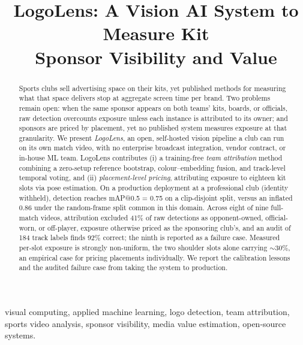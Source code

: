 \documentclass[conference,a4paper]{IEEEtran}
\begin{document}
\title{LogoLens: A Vision AI System to Measure Kit\\
Sponsor Visibility and Value}

\author{
}

\maketitle

\begin{abstract}
Sports clubs sell advertising space on their kits, yet published methods for measuring
what that space delivers stop at aggregate screen time per brand. Two problems remain
open: when the same sponsor appears on both teams' kits, boards, or officials, raw
detection overcounts exposure unless each instance is attributed to its owner; and
sponsors are priced by placement, yet no published system measures exposure at that
granularity. We present \emph{LogoLens}, an open, self-hosted vision pipeline a club
can run on its own match video, with no enterprise broadcast integration, vendor
contract, or in-house ML team. LogoLens contributes (i) a training-free \emph{team attribution}
method combining a zero-setup reference bootstrap, colour--embedding fusion, and
track-level temporal voting, and (ii) \emph{placement-level pricing}, attributing
exposure to eighteen kit slots via pose estimation. On a production deployment at a
professional club (identity withheld), detection reaches mAP@0.5 = 0.75 on a
clip-disjoint split, versus an inflated 0.86 under the random-frame split common in
this domain. Across eight of nine full-match videos, attribution excluded 41\% of raw
detections as opponent-owned, official-worn, or off-player, exposure otherwise priced
as the sponsoring club's, and an audit of 184 track labels finds 92\% correct; the
ninth is reported as a failure case. Measured per-slot exposure is strongly
non-uniform, the two shoulder slots alone carrying $\sim$30\%, an empirical case for
pricing placements individually. We report the calibration lessons and the audited
failure case from taking the system to production.
\end{abstract}

\begin{IEEEkeywords}
visual computing, applied machine learning, logo detection, team attribution, sports
video analysis, sponsor visibility, media value estimation, open-source systems.
\end{IEEEkeywords}
\end{document}
